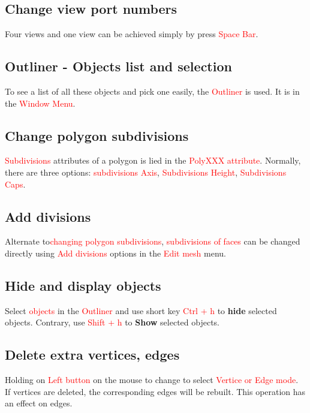 \subsection{Change view port numbers}
Four views and one view can be achieved simply by press \textcolor{red}{Space Bar}.

\subsection{Outliner - Objects list and selection}
To see a list of all these objects and pick one easily, the \textcolor{red}{Outliner} is used. It is in the \textcolor{red}{Window Menu}.

\subsection{Change polygon subdivisions}
\textcolor{red}{Subdivisions} attributes of a polygon is lied in the \textcolor{red}{PolyXXX attribute}. Normally, there are three options: \textcolor{red}{subdivisions Axis}, \textcolor{red}{Subdivisions Height}, \textcolor{red}{Subdivisions Caps}.

\subsection{Add divisions}
Alternate to\textcolor{red}{changing polygon subdivisions}, \textcolor{red}{subdivisions of faces} can be changed directly using \textcolor{red}{Add divisions} options in the \textcolor{red}{Edit mesh} menu.

\subsection{Hide and display objects}
Select \textcolor{red}{objects} in the \textcolor{red}{Outliner} and use short key \textcolor{red}{Ctrl + h} to \textbf{hide} selected objects. Contrary, use \textcolor{red}{Shift + h} to \textbf{Show} selected objects.

\subsection{Delete extra vertices, edges}
Holding on \textcolor{red}{Left button} on the mouse to change to select \textcolor{red}{Vertice or Edge mode}.\\

If vertices are deleted, the corresponding edges will be rebuilt. This operation has an effect on edges.\\

